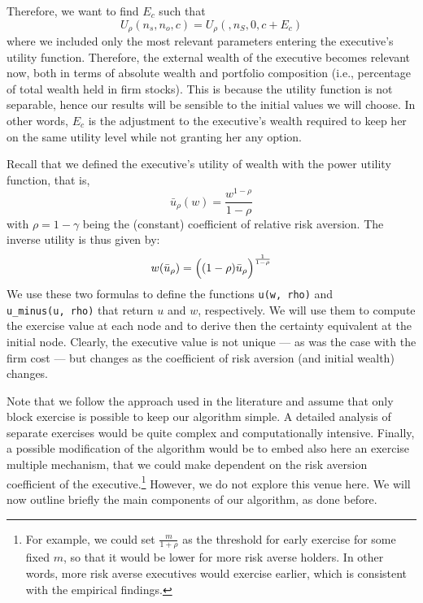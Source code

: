 Therefore, we want to find $E_c$ such that 
$$U_\rho(n_s, n_o, c) = U_\rho(, n_S, 0, c + E_c) $$ %
where we included only the most relevant parameters entering the executive's utility function. Therefore, the external wealth of the executive becomes relevant now, both in terms of absolute wealth and portfolio composition (i.e., percentage of total wealth held in firm stocks). This is because the utility function is not separable, hence our results will be sensible to the initial values we will choose. In other words, $E_c$ is the adjustment to the executive's wealth required to keep her on the same utility level while not granting her any option.

Recall that we defined the executive's utility of wealth with the power utility function, that is, 
$$\bar{u}_\rho(w) = \frac{w^{1-\rho}}{1-\rho}$$
with $\rho = 1 - \gamma $ being the (constant) coefficient of relative risk aversion. 
The inverse utility is thus given by:
$$w(\bar{u}_\rho) = \Bigl( (1-\rho)\bar{u}_\rho \Bigr)^{\frac{1}{1-\rho}}$$
We use these two formulas to define the functions \verb|u(w, rho)| and \\
\verb|u_minus(u, rho)| that return $u$ and $w$, respectively. We will use them to compute the exercise value at each node and to derive then the certainty equivalent at the initial node. Clearly, the executive value is not unique --- as was the case with the firm cost --- but changes as the coefficient of risk aversion (and initial wealth) changes.


Note that we follow the approach used in the literature and assume that only block exercise is possible  to keep our algorithm simple. A detailed analysis of separate exercises would be quite complex and computationally intensive. 
Finally, a possible modification of the algorithm would be to embed also here an exercise multiple mechanism, that we could make dependent on the risk aversion coefficient of the executive.\footnote{For example, we could set $\frac{m}{1+\rho}$ as the threshold for early exercise for some fixed $m$, so that it would be lower for more risk averse holders. In other words, more risk averse executives would exercise earlier, which is consistent with the empirical findings.} However, we do not explore this venue here.
We will now outline briefly the main components of our algorithm, as done before.

